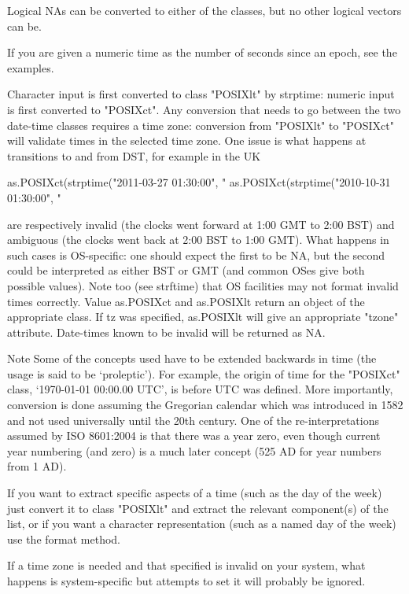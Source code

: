 Logical NAs can be converted to either of the classes, but no other logical vectors can be. 

If you are given a numeric time as the number of seconds since an epoch, see the examples. 

Character input is first converted to class "POSIXlt" by strptime: numeric input is first converted to "POSIXct". Any conversion that needs to go between the two date-time classes requires a time zone: conversion from "POSIXlt" to "POSIXct" will validate times in the selected time zone. One issue is what happens at transitions to and from DST, for example in the UK 

as.POSIXct(strptime("2011-03-27 01:30:00", "%
as.POSIXct(strptime("2010-10-31 01:30:00", "%

are respectively invalid (the clocks went forward at 1:00 GMT to 2:00 BST) and ambiguous (the clocks went back at 2:00 BST to 1:00 GMT). What happens in such cases is OS-specific: one should expect the first to be NA, but the second could be interpreted as either BST or GMT (and common OSes give both possible values). Note too (see strftime) that OS facilities may not format invalid times correctly. 
Value
as.POSIXct and as.POSIXlt return an object of the appropriate class. If tz was specified, as.POSIXlt will give an appropriate "tzone" attribute. Date-times known to be invalid will be returned as NA. 

Note
Some of the concepts used have to be extended backwards in time (the usage is said to be ‘proleptic’). For example, the origin of time for the "POSIXct" class, ‘1970-01-01 00:00.00 UTC’, is before UTC was defined. More importantly, conversion is done assuming the Gregorian calendar which was introduced in 1582 and not used universally until the 20th century. One of the re-interpretations assumed by ISO 8601:2004 is that there was a year zero, even though current year numbering (and zero) is a much later concept (525 AD for year numbers from 1 AD). 

If you want to extract specific aspects of a time (such as the day of the week) just convert it to class "POSIXlt" and extract the relevant component(s) of the list, or if you want a character representation (such as a named day of the week) use the format method. 

If a time zone is needed and that specified is invalid on your system, what happens is system-specific but attempts to set it will probably be ignored. 

